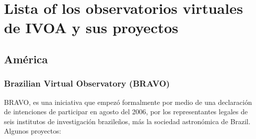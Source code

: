 \section{Lista of los observatorios virtuales de IVOA y sus proyectos}
\subsection{América}
\subsubsection{Brazilian Virtual Observatory (BRAVO)}
BRAVO, es una iniciativa que empezó formalmente por medio de una declaración de
intenciones de participar en agosto del 2006, por los representantes legales de
seis institutos de investigación brazileños, más la sociedad astronómica de
Brazil. Algunos proyectos: 
